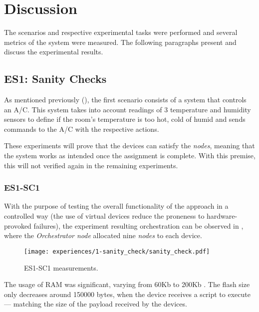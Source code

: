\section{Discussion}\label{sec:evaluation_discussion}

The scenarios and respective experimental tasks were performed and several metrics of the system were measured. The following paragraphs present and discuss the experimental results.

\subsection{ES1: Sanity Checks}\label{sec:discussion_scenario1}

As mentioned previously (\cf {}), the first scenario consists of a system that controls an A/C. This system takes into account readings of 3 temperature and humidity sensors to define if the room's temperature is too hot, cold of humid and sends commands to the A/C with the respective actions.

These experiments will prove that the devices can satisfy the \textit{nodes}, meaning that the system works as intended once the assignment is complete. With this premise, this will not verified again in the remaining experiments.


\subsubsection{ES1-SC1}\label{sec:sanity_check_exp}

With the purpose of testing the overall functionality of the approach in a controlled way (the use of virtual devices reduce the proneness to hardware-provoked failures), the experiment resulting orchestration can be observed in , where the \textit{Orchestrator node} allocated nine \textit{nodes} to each device.

\begin{figure}[h]
\centering
\texttt{[image: experiences/1-sanity\_check/sanity\_check.pdf]}
\caption[ES1-SC1 measurements.]{ES1-SC1 measurements.}\label{fig:sanity_check_graph}
\end{figure}

The usage of RAM was significant, varying from 60Kb to 200Kb . The flash size only decreases around 150000 bytes, when the device receives a script to execute --- matching the size of the payload received by the devices.

